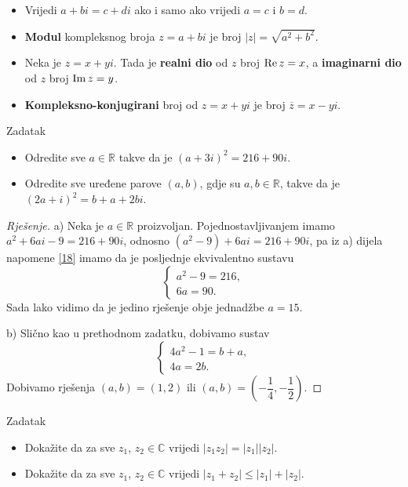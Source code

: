 \begin{remark} \textbf{}
\label{18}
\begin{itemize}
\item[a)] Vrijedi \(a+bi=c+di\) ako i samo ako vrijedi \(a=c\) i \(b=d\).
\item[b)] \textbf{Modul} kompleksnog broja \(z=a+bi\) je broj \(\left\lvert z\right\rvert=\sqrt{a^2+b^2}\).
\item[c)] Neka je \(z=x+yi\). Tada je \textbf{realni dio} od \(z\) broj \(\operatorname{Re}{z}=x\), a \textbf{imaginarni dio} od \(z\) broj \(\operatorname{Im}{z}=y\).
\item[d)] \textbf{Kompleksno-konjugirani} broj od \(z=x+yi\) je broj \(\overline{z}=x-yi\).
\end{itemize}
\end{remark}

\begin{exercise}{Zadatak}\textbf{}
\begin{itemize}
\item[a)] Odredite sve \(a\in \mathbb{R}\) takve da je \((a+3i)^2=216+90i\).
\item[b)] Odredite sve uređene parove \((a, b)\), gdje su $a, b\in \mathbb{R}$, takve da je \((2a+i)^2=b+a+2bi\).
\end{itemize}
\end{exercise}
\begin{proof}[Rješenje]
a) Neka je \(a\in \mathbb{R}\) proizvoljan. Pojednostavljivanjem imamo \(a^2+6ai-9=216+90i\), odnosno \((a^2-9)+6ai=216+90i\), pa iz a) dijela napomene \ref{18} imamo da je posljednje ekvivalentno sustavu
\[\begin{cases}
a^2-9=216,\\
6a=90.
\end{cases}\]
Sada lako vidimo da je jedino rješenje obje jednadžbe \(a=15\).

b) Slično kao u prethodnom zadatku, dobivamo sustav
\[\begin{cases}
4a^2-1=b+a,\\
4a=2b.
\end{cases}\]
Dobivamo rješenja $(a, b)=(1, 2)$ ili $(a, b)=\left(-\dfrac{1}{4},-\dfrac{1}{2}\right)$.
\end{proof}
\begin{exercise}{Zadatak} \textbf{}
\begin{itemize}
\item[a)] Dokažite da za sve \(z_1\), \(z_2\in \mathbb{C}\) vrijedi \(\left\lvert z_1z_2 \right\rvert=\left\lvert z_1\right\rvert \left\lvert z_2\right\rvert\).
\item[b)] Dokažite da za sve \(z_1\), \(z_2\in \mathbb{C}\) vrijedi \(\left\lvert z_1+z_2\right\rvert\leq \left\lvert z_1\right\rvert+\left\lvert z_2\right\rvert\).
\end{itemize}
\end{exercise}
